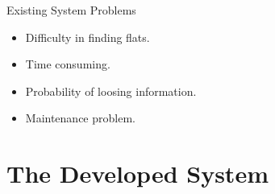 \documentclass{beamer}
\begin{document}
\begin{frame} {Existing System Problems}

\begin{itemize}
 
    \item Difficulty in finding flats.
    \item Time consuming.
    \item Probability of loosing information.
    \item Maintenance problem.
\end{itemize}
    
\end{frame}


\section{The Developed System} 
\end{document}
